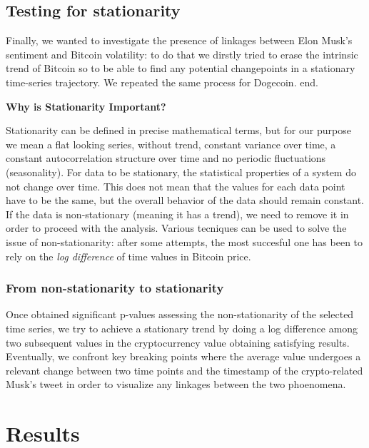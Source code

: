 \documentclass[
]{article}
\begin{document}
\hypertarget{testing-for-stationarity}{%
\subsection{Testing for stationarity}\label{testing-for-stationarity}}

Finally, we wanted to investigate the presence of linkages between Elon
Musk's sentiment and Bitcoin volatility: to do that we dirstly tried to
erase the intrinsic trend of Bitcoin so to be able to find any potential
changepoints in a stationary time-series trajectory. We repeated the
same process for Dogecoin. end.

\textbf{Why is Stationarity Important?}

Stationarity can be defined in precise mathematical terms, but for our
purpose we mean a flat looking series, without trend, constant variance
over time, a constant autocorrelation structure over time and no
periodic fluctuations (seasonality). For data to be stationary, the
statistical properties of a system do not change over time. This does
not mean that the values for each data point have to be the same, but
the overall behavior of the data should remain constant. If the data is
non-stationary (meaning it has a trend), we need to remove it in order
to proceed with the analysis. Various tecniques can be used to solve the
issue of non-stationarity: after some attempts, the most succesful one
has been to rely on the \emph{log difference} of time values in Bitcoin
price.

\hypertarget{from-non-stationarity-to-stationarity}{%
\subsubsection{From non-stationarity to
stationarity}\label{from-non-stationarity-to-stationarity}}

Once obtained significant p-values assessing the non-stationarity of the
selected time series, we try to achieve a stationary trend by doing a
log difference among two subsequent values in the cryptocurrency value
obtaining satisfying results. Eventually, we confront key breaking
points where the average value undergoes a relevant change between two
time points and the timestamp of the crypto-related Musk's tweet in
order to visualize any linkages between the two phoenomena.

\hypertarget{results}{%
\section{Results}\label{results}}
\end{document}
